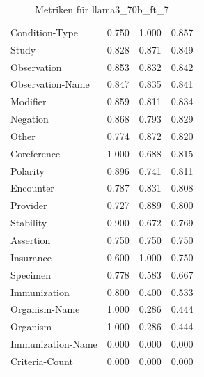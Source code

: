 \begin{table}[htbp]
\begin{tabular}{p{5cm}ccc}
Condition-Type & 0.750 & 1.000 & 0.857 \\
Study & 0.828 & 0.871 & 0.849 \\
Observation & 0.853 & 0.832 & 0.842 \\
Observation-Name & 0.847 & 0.835 & 0.841 \\
Modifier & 0.859 & 0.811 & 0.834 \\
Negation & 0.868 & 0.793 & 0.829 \\
Other & 0.774 & 0.872 & 0.820 \\
Coreference & 1.000 & 0.688 & 0.815 \\
Polarity & 0.896 & 0.741 & 0.811 \\
Encounter & 0.787 & 0.831 & 0.808 \\
Provider & 0.727 & 0.889 & 0.800 \\
Stability & 0.900 & 0.672 & 0.769 \\
Assertion & 0.750 & 0.750 & 0.750 \\
Insurance & 0.600 & 1.000 & 0.750 \\
Specimen & 0.778 & 0.583 & 0.667 \\
Immunization & 0.800 & 0.400 & 0.533 \\
Organism-Name & 1.000 & 0.286 & 0.444 \\
Organism & 1.000 & 0.286 & 0.444 \\
Immunization-Name & 0.000 & 0.000 & 0.000 \\
Criteria-Count & 0.000 & 0.000 & 0.000 \\
\bottomrule
\end{tabular}
\caption{Metriken für llama3_70b_ft_7}
\label{tab:metrics_llama3_70b_ft_7}
\end{table}